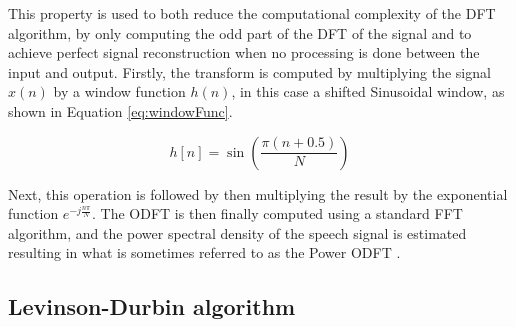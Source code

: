 This property is used to both reduce the computational complexity of the DFT algorithm, by only computing the odd part of the DFT of the signal and to achieve perfect signal reconstruction \cite{ferreiraAccurateEstimationODFT2001} when no processing is done between the input and output. Firstly, the transform is computed by multiplying the signal $x(n)$ by a window function $h(n)$, in this case a shifted Sinusoidal window, as shown in Equation \ref{eq:windowFunc}.

\begin{equation}
    h[n] = \sin \left ( \frac{\pi(n+0.5)}{N} \right )
    \label{eq:windowFunc}
\end{equation}

Next, this operation is followed by then multiplying the result by the exponential function $e^{-j\frac{n\pi}{N}}$. The ODFT is then finally computed using a standard FFT algorithm, and the power spectral density of the speech signal is estimated resulting in what is sometimes referred to as the Power ODFT \cite{goncalvesVozeamentoSinteticoVoz2023}.




\subsection{Levinson-Durbin algorithm}

